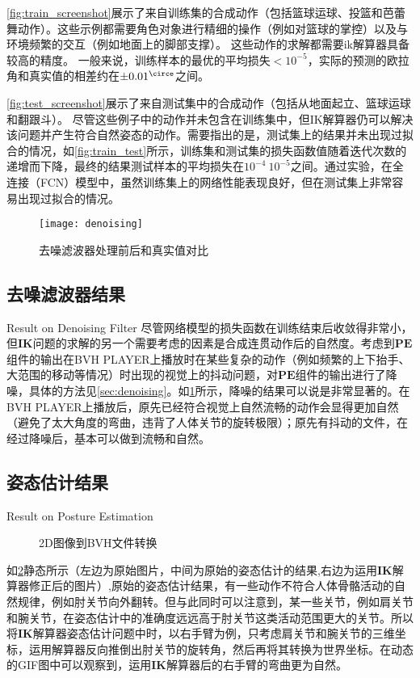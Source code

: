 \cref{fig:train_screenshot}展示了来自训练集的合成动作（包括篮球运球、投篮和芭蕾舞动作）。这些示例都需要角色对象进行精细的操作（例如对篮球的掌控）以及与环境频繁的交互（例如地面上的脚部支撑）。 这些动作的求解都需要ik解算器具备较高的精度。 一般来说，训练样本的最优的平均损失$<10^{-5}$，实际的预测的欧拉角和真实值的相差约在$\pm0.01^{\circe}$之间。

\cref{fig:test_screenshot}展示了来自测试集中的合成动作（包括从地面起立、篮球运球和翻跟斗）。
尽管这些例子中的动作并未包含在训练集中，但IK解算器仍可以解决该问题并产生符合自然姿态的动作。需要指出的是，测试集上的结果并未出现过拟合的情况，如\cref{fig:train_test}所示，训练集和测试集的损失函数值随着迭代次数的递增而下降，最终的结果测试样本的平均损失在$10^{-4}~10^{-5}$之间。通过实验，在全连接（FCN）模型中，虽然训练集上的网络性能表现良好，但在测试集上非常容易出现过拟合的情况。

\begin{figure}[!htbp]
	\centering
	\texttt{[image: denoising]}
	\caption[]{\label{fig:denoising}
		去噪滤波器处理前后和真实值对比
	}
\end{figure}
\subsection{去噪滤波器结果}{Result on Denoising Filter}
尽管网络模型的损失函数在训练结束后收敛得非常小，但\textbf{IK}问题的求解的另一个需要考虑的因素是合成连贯动作后的自然度。考虑到$\mathbf{PE}$组件的输出在BVH PLAYER上播放时在某些复杂的动作（例如频繁的上下抬手、大范围的移动等情况）时出现的视觉上的抖动问题，对$\mathbf{PE}$组件的输出进行了降噪，具体的方法见\ref{sec:denoising}。如\cref{fig:denoising}所示，降噪的结果可以说是非常显著的。在BVH PLAYER上播放后，原先已经符合视觉上自然流畅的动作会显得更加自然（避免了太大角度的弯曲，违背了人体关节的旋转极限）；原先有抖动的文件，在经过降噪后，基本可以做到流畅和自然。
\label{res:denoising}

\subsection{姿态估计结果}{Result on Posture Estimation}
\begin{figure}
\centering
{}
\caption{2D图像到BVH文件转换}
\label{fig:2dtobvh}
\end{figure}
如\cref{fig:2dtobvh}静态所示（左边为原始图片，中间为原始的姿态估计的结果\cite{kanazawa2018end},右边为运用$\mathbf{IK}$解算器修正后的图片）,原始的姿态估计结果，有一些动作不符合人体骨骼活动的自然规律，例如肘关节向外翻转。但与此同时可以注意到，某一些关节，例如肩关节和腕关节，在姿态估计中的准确度远远高于肘关节这类活动范围更大的关节。所以将$\mathbf{IK}$解算器姿态估计问题中时，以右手臂为例，只考虑肩关节和腕关节的三维坐标，运用解算器反向推倒出肘关节的旋转角，然后再将其转换为世界坐标。在动态的GIF图中可以观察到，运用$\mathbf{IK}$解算器后的右手臂的弯曲更为自然。

